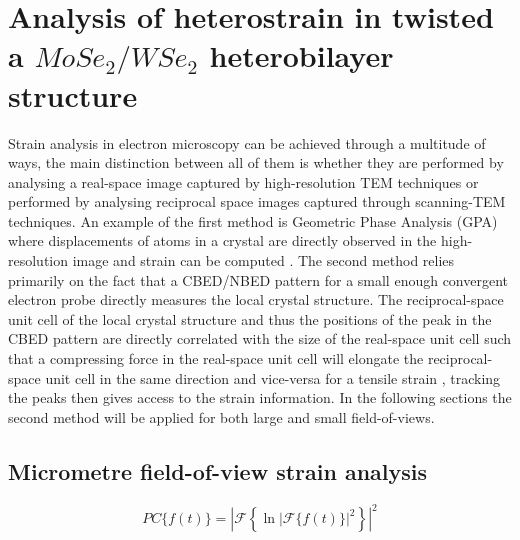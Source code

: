 \chapter{Analysis of heterostrain in twisted a $MoSe_2/WSe_2$ heterobilayer structure}%
%
Strain analysis in electron microscopy can be achieved through a multitude of ways, the main distinction between all of them is whether they are performed by analysing a real-space image captured by high-resolution TEM techniques or performed by analysing reciprocal space images captured through scanning-TEM techniques. 
%
An example of the first method is Geometric Phase Analysis (GPA) where displacements of atoms in a crystal are directly observed in the high-resolution image and strain can be computed \cite{HYTCH1998131, hytchGEOMETRICPHASEANALYSIS1997, nguyenAtomicDefectsDoping2017}. 
%
The second method relies primarily on the fact that a CBED/NBED pattern for a small enough convergent electron probe directly measures the local crystal structure. 
%
The reciprocal-space unit cell of the local crystal structure and thus the positions of the peak in the CBED pattern are directly correlated with the size of the real-space unit cell such that a compressing force in the real-space unit cell will elongate the reciprocal-space unit cell in the same direction and vice-versa for a tensile strain \cite{ophusFourDimensionalScanningTransmission2019, vanwinkleRotationalDilationalReconstruction2023, kazmierczakStrainFieldsTwisted2021, hanStrainMappingTwoDimensional2018}, tracking the peaks then gives access to the strain information.  In the following sections the second method will be applied for both large and small field-of-views.

\section{Micrometre field-of-view strain analysis}
%
\begin{equation}
	PC\{f(t)\} = \left| \mathscr{F} \left\{ \ln{\left| \mathscr{F}\{f(t)\} \right|^2} \right\} \right|^2
	\label{eq:cepstrum}
\end{equation}

